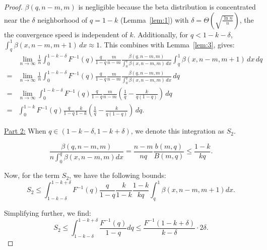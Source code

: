 \begin{proof}
    \(\beta(q, n-m, m)\) is negligible because the beta distribution is concentrated near the $\delta$ neighborhood of \(q = 1-k\) (Lemma~\ref{lem:1}) with $\delta = \Theta(\sqrt{\frac{\ln n}{n}})$, the the convergence speed is independent of $k$. Additionally, for \(q < 1-k-\delta\), \(\int_q^1 \beta(x, n-m, m+1) \, dx \approx 1\). This combines with Lemma~\ref{lem:3}, gives:
    \[
    \begin{aligned}
        & \lim_{n \to \infty} \frac{1}{n}\int_0^{1-k-\delta}F^{-1}(q)\frac{q}{1-q} \frac{m}{n-m}\frac{\beta(q,n-m,m)}{\int_0^q\beta(x,n-m,m)\,dx}\int_q^1\beta(x,n-m,m+1)\,dx\, dq \\
        = & \lim_{n \to \infty} \frac{1}{n}\int_0^{1-k-\delta}F^{-1}(q)\frac{q}{1-q} \frac{m}{n-m}\frac{\beta(q,n-m,m)}{\int_0^q\beta(x,n-m,m)\,dx}\, dq \\
        = & \lim_{n \to \infty} \int_0^{1-k-\delta}F^{-1}(q)\frac{q}{1-q} \frac{m}{n-m}\left (\frac{1}{q} -\frac{k}{q(1-q)} \right)\, dq \\
        = & \int_0^{1-k}F^{-1}(q)\frac{q}{1-q} \frac{k}{1-k}\left (\frac{1}{q} -\frac{k}{q(1-q)} \right)\, dq.
    \end{aligned}
    \]

    \underline{Part 2:} When $q\in (1-k-\delta, 1-k+\delta)$, we denote this integration as $S_2$.


\[
\frac{\beta(q, n-m, m)}{n \int_0^q \beta(x, n-m, m) dx} = \frac{n-m}{nq} \frac{b(m, q)}{B(m, q)} \leq \frac{1-k}{kq}.
\]

Now, for the term \( S_2 \), we have the following bounds:
\[
S_2 \leq \int_{1-k-\delta}^{1-k+\delta} F^{-1}(q) \frac{q}{1-q} \frac{k}{1-k} \frac{1-k}{kq} \int_q^1 \beta(x, n-m, m+1) dx.
\]

Simplifying further, we find:
\[
S_2 \leq \int_{1-k-\delta}^{1-k+\delta} \frac{F^{-1}(q)}{1-q} dq \leq \frac{F^{-1}(1-k+\delta)}{k-\delta} \cdot 2\delta.
\]


\end{proof}
